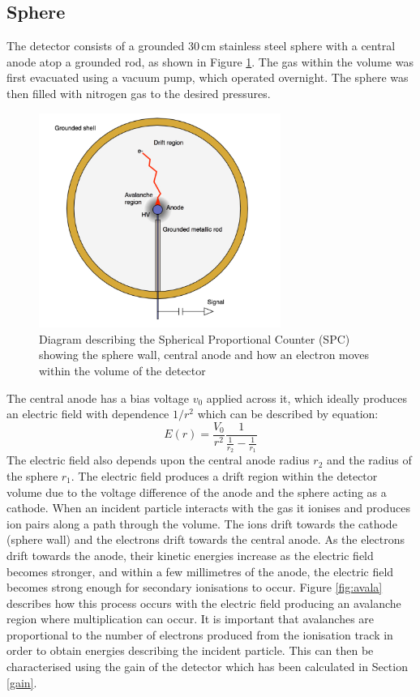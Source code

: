 \documentclass[a4paper]{article}
\begin{document}
\subsection{Sphere}
The detector consists of a grounded 30\,cm stainless steel sphere with a central anode atop a grounded rod, as shown in Figure \ref{fig:sphere}. The gas within the volume was first evacuated using a vacuum pump, which operated overnight. The sphere was then filled with nitrogen gas to the desired pressures. 
\begin{figure}[H]
    \centering
    \includegraphics[height=7cm]{sphere.png}
    \caption{Diagram describing the Spherical Proportional Counter (SPC) showing the sphere wall, central anode and how an electron moves within the volume of the detector\cite{savvidis2017low}}
    \label{fig:sphere}
\end{figure}
\noindent The central anode has a bias voltage $v_0$ applied across it, which ideally produces an electric field with dependence $1/r^2$ which can be described by equation:
\begin{equation}
    E(r) = \frac{V_0}{r^2}\frac{1}{\frac{1}{r_2}-\frac{1}{r_1}}
\end{equation}
The electric field also depends upon the central anode radius $r_2$ and the radius of the sphere $r_1$. The electric field produces a drift region within the detector volume due to the voltage difference of the anode and the sphere acting as a cathode. When an incident particle interacts with the gas it ionises and produces ion pairs along a path through the volume. The ions drift towards the cathode (sphere wall) and the electrons drift towards the central anode. As the electrons drift towards the anode, their kinetic energies increase as the electric field becomes stronger, and within a few millimetres of the anode, the electric field becomes strong enough for secondary ionisations to occur. Figure \ref{fig:avala} describes how this process occurs with the electric field producing an avalanche region where multiplication can occur. It is important that avalanches are proportional to the number of electrons produced from the ionisation track in order to obtain energies describing the incident particle. This can then be characterised using the gain of the detector which has been calculated in Section \ref{gain}.
\end{document}
